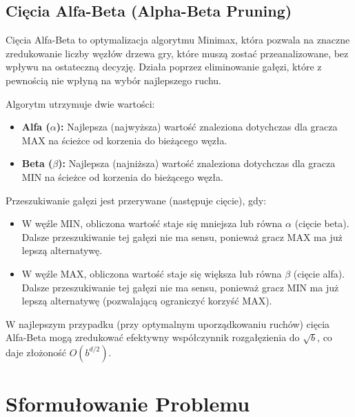 \documentclass[12pt,a4paper]{article}
\begin{document}
\subsection{Cięcia Alfa-Beta (Alpha-Beta Pruning)}
Cięcia Alfa-Beta to optymalizacja algorytmu Minimax, która pozwala na znaczne zredukowanie liczby węzłów drzewa gry, które muszą zostać przeanalizowane, bez wpływu na ostateczną decyzję. Działa poprzez eliminowanie gałęzi, które z pewnością nie wpłyną na wybór najlepszego ruchu.

Algorytm utrzymuje dwie wartości:
\begin{itemize}
    \item \textbf{Alfa ($\alpha$):} Najlepsza (najwyższa) wartość znaleziona dotychczas dla gracza MAX na ścieżce od korzenia do bieżącego węzła.
    \item \textbf{Beta ($\beta$):} Najlepsza (najniższa) wartość znaleziona dotychczas dla gracza MIN na ścieżce od korzenia do bieżącego węzła.
\end{itemize}
Przeszukiwanie gałęzi jest przerywane (następuje cięcie), gdy:
\begin{itemize}
    \item W węźle MIN, obliczona wartość staje się mniejsza lub równa $\alpha$ (cięcie beta). Dalsze przeszukiwanie tej gałęzi nie ma sensu, ponieważ gracz MAX ma już lepszą alternatywę.
    \item W węźle MAX, obliczona wartość staje się większa lub równa $\beta$ (cięcie alfa). Dalsze przeszukiwanie tej gałęzi nie ma sensu, ponieważ gracz MIN ma już lepszą alternatywę (pozwalającą ograniczyć korzyść MAX).
\end{itemize}
W najlepszym przypadku (przy optymalnym uporządkowaniu ruchów) cięcia Alfa-Beta mogą zredukować efektywny współczynnik rozgałęzienia do $\sqrt{b}$, co daje złożoność $O(b^{d/2})$.

\section{Sformułowanie Problemu}
\end{document}
